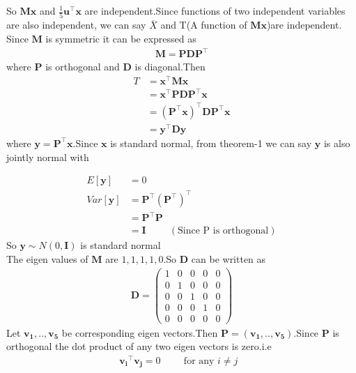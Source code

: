 \documentclass{beamer}
\renewcommand{\vec}[1]{\mathbf{#1}}
\providecommand{\brak}[1]{\ensuremath{\left(#1\right)}}
\newcommand{\myvec}[1]{\ensuremath{\begin{pmatrix}#1\end{pmatrix}}}
\providecommand{\mean}[1]{E[ #1 ]}
\providecommand{\sbrak}[1]{\ensuremath{{}\left[#1\right]}}
\begin{document}
\begin{frame}
   So $\vec{M}\vec{x}$ and $\frac{1}{5}\vec{u}^{\top}\vec{x}$ are independent.Since functions of two independent variables are also independent, we can say $\overline{X}$ and T(A function of $\vec{M}\vec{x}$)are independent.\\
   
Since $\vec{M}$ is symmetric it can be expressed as
\begin{align}
    \vec{M}=\vec{P}\vec{D}\vec{P}^{\top}
\end{align}
where $\vec{P}$ is orthogonal and $\vec{D}$ is diagonal.Then
\begin{align}
    T&=\vec{x}^{\top}\vec{M}\vec{x}\\
    &=\vec{x}^{\top}\vec{P}\vec{D}\vec{P}^{\top}\vec{x}\\
    &=\brak{\vec{P}^{\top}\vec{x}}^{\top}\vec{D}\vec{P}^{\top}\vec{x}\\
    &=\vec{y}^{\top}\vec{D}\vec{y}
\end{align}
where $\vec{y}=\vec{P}^{\top}\vec{x}$.Since $\vec{x}$ is standard normal, from theorem-1 we can say $\vec{y}$ is also jointly normal with
\end{frame}
\begin{frame}
\begin{align}
    \mean{\vec{y}}&=0\\
    Var\sbrak{\vec{y}}&=\vec{P}^{\top}\brak{\vec{P}^{\top}}^{\top}\\
    &=\vec{P}^{\top}\vec{P}\\
    &=\vec{I} \hspace{1cm} \brak{\text{Since P is orthogonal}}
\end{align}
So $\vec{y}\sim N\brak{0,\vec{I}}$ is standard normal\\
The eigen values of $\vec{M}$ are $1,1,1,1,0$.So $\vec{D}$ can be written as
    \begin{align}
        \vec{D}=\myvec{1&0&0&0&0\\
                       0&1&0&0&0\\
                       0&0&1&0&0\\
                       0&0&0&1&0\\
                       0&0&0&0&0}
    \end{align}
    Let $\vec{v_1},..,\vec{v_5}$ be corresponding eigen vectors.Then $\vec{P}=\brak{\vec{v_1},..,\vec{v_5}}$.Since $\vec{P}$ is orthogonal the dot product of any two eigen vectors is zero.i.e
    \begin{align}
        \vec{v_i}^{\top}\vec{v_j}=0 \label{ind}
        \hspace{1cm}\text{for any $i\neq j$ }
    \end{align}
      
\end{frame}
\end{document}
